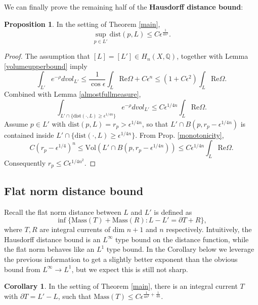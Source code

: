 \documentclass[a4paper]{article}
\theoremstyle{definition}
\newtheorem{cor}[thm]{Corollary}
\newtheorem{prop}[thm]{Proposition}
\newcommand{\Q}{\mathbb{Q}}
\begin{document}
We can finally prove the remaining half of the \textbf{Hausdorff distance bound}:


\begin{prop}
In the setting of Theorem \ref{main}, 
\begin{equation}
\sup_{p\in L'} \text{dist}(p,L)\leq C\epsilon^{ \frac{1}{4n^2}  }.
\end{equation}
\end{prop}



\begin{proof}
The assumption that $[L]=[L']\in H_n(X,\Q)$, together with Lemma \ref{volumeupperbound} imply
\[
\int_{L'}e^{-\rho}dvol_{L'} \leq \frac{1}{\cos \epsilon} \int_{L}\text{Re}\Omega+C\epsilon^n\leq (1+C\epsilon^2) \int_{L}\text{Re}\Omega.
\]
Combined with Lemma \ref{almostfullmeasure},
\[
\int_{L'\cap \{   \text{dist}(\cdot, L)\geq \epsilon^{1/4n} \} } e^{-\rho}dvol_{L'} \leq C\epsilon^{1/{4n}} \int_L \text{Re}\Omega.
\]
Assume $p\in L'$ with $\text{dist}(p,L)=r_p>\epsilon^{1/4n}$, so that $L'\cap B(p,r_p- \epsilon^{1/4n} )$ is contained inside  $L'\cap \{   \text{dist}(\cdot, L)\geq \epsilon^{1/4n} \}$. From Prop. \ref{monotonicity},
\[
C(r_p-\epsilon^{1/4})^n \leq \text{Vol}( L'\cap  B(p,r_p- \epsilon^{1/4n} ) ) \leq C\epsilon^{1/{4n}} \int_L \text{Re}\Omega.
\]
Consequently $r_p\leq C\epsilon^{1/4n^2}$.
\end{proof}







\subsection{Flat norm distance bound}




Recall the flat norm distance between $L$ and $L'$ is defined as
\[
\inf \{  \text{Mass}(T)+ \text{Mass}(R)  : L-L'= \partial T+ R             \},
\]
where $T, R$ are integral currents of dim $n+1$ and $n$ respectively. Intuitively, the Hausdorff distance bound is an $L^\infty$ type bound on the distance function, while the flat norm behaves like an $L^1$ type bound. In the Corollary below we leverage the previous information to get a slightly better exponent than the obvious bound from $L^\infty\to L^1$, but we expect this is still not sharp.



\begin{cor}
In the setting of Theorem \ref{main}, there is an integral current $T$ with $\partial T=L'-L$, such that $\text{Mass}(T)\leq C\epsilon^{\frac{1}{4n^2}+ \frac{1}{4n} }$. 
\end{cor}
\end{document}
